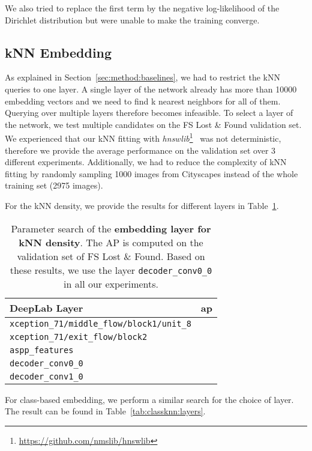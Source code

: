 We also tried to replace the first term by the negative log-likelihood of the Dirichlet distribution but were unable to make the training converge.

\subsection{kNN Embedding}
 As explained in Section~\ref{sec:method:baselines}, we had to restrict the kNN queries to one layer. A single layer of the network already has more than 10000 embedding vectors and we need to find k nearest neighbors for all of them. Querying over multiple layers therefore becomes infeasible. To select a layer of the network, we test multiple candidates on the FS Lost \& Found validation set. We experienced that our kNN fitting with \emph{hnswlib}\footnote{\url{https://github.com/nmslib/hnswlib}}~\cite{Malkov2016-fv} was not deterministic, therefore we provide the average performance on the validation set over 3 different experiments. Additionally, we had to reduce the complexity of kNN fitting by randomly sampling 1000 images from Cityscapes instead of the whole training set (2975 images).

For the kNN density, we provide the results for different layers in Table~\ref{tab:knn:layers}.

\begin{table}[htb]
\centering
\footnotesize
\begin{tabular}{lc}
\toprule
DeepLab Layer & \ac{ap} \\
\midrule
\scriptsize{\verb|xception_71/middle_flow/block1/unit_8|} &  \\
\scriptsize{\verb|xception_71/exit_flow/block2|}          &  \\
\scriptsize{\verb|aspp_features|}                         & \\
\scriptsize{\verb|decoder_conv0_0|}                       &  \\
\scriptsize{\verb|decoder_conv1_0|}                       &  \\
\bottomrule
\end{tabular}
\vspace{3mm}
\caption{Parameter search of the \textbf{embedding layer for kNN density}. The AP is computed on the validation set of FS Lost \& Found. Based on these results, we use the layer \texttt{decoder\_conv0\_0} in all our experiments.}
\label{tab:knn:layers}
\end{table}

For class-based embedding, we perform a similar search for the choice of layer. The result can be found in Table~\ref{tab:classknn:layers}.

